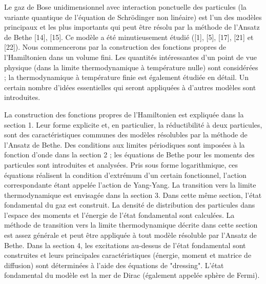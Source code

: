 Le gaz de Bose unidimensionnel avec interaction ponctuelle des particules (la variante quantique de l'équation de Schrödinger non linéaire) est l'un des modèles principaux et les plus importants qui peut être résolu par la méthode de l'Ansatz de Bethe [14], [15]. Ce modèle a été minutieusement étudié ([1], [5], [17], [21] et [22]). Nous commencerons par la construction des fonctions propres de l'Hamiltonien dans un volume fini. Les quantités intéressantes d'un point de vue physique (dans la limite thermodynamique à température nulle) sont considérées ; la thermodynamique à température finie est également étudiée en détail. Un certain nombre d'idées essentielles qui seront appliquées à d'autres modèles sont introduites.

La construction des fonctions propres de l'Hamiltonien est expliquée dans la section 1. Leur forme explicite et, en particulier, la réductibilité à deux particules, sont des caractéristiques communes des modèles résolubles par la méthode de l'Ansatz de Bethe. Des conditions aux limites périodiques sont imposées à la fonction d'onde dans la section 2 ; les équations de Bethe pour les moments des particules sont introduites et analysées. Pris sous forme logarithmique, ces équations réalisent la condition d'extrémum d'un certain fonctionnel, l'action correspondante étant appelée l'action de Yang-Yang. La transition vers la limite thermodynamique est envisagée dans la section 3. Dans cette même section, l'état fondamental du gaz est construit. La densité de distribution des particules dans l'espace des moments et l'énergie de l'état fondamental sont calculées. La méthode de transition vers la limite thermodynamique décrite dans cette section est assez générale et peut être appliquée à tout modèle résoluble par l'Ansatz de Bethe. Dans la section 4, les excitations au-dessus de l'état fondamental sont construites et leurs principales caractéristiques (énergie, moment et matrice de diffusion) sont déterminées à l'aide des équations de "dressing". L'état fondamental du modèle est la mer de Dirac (également appelée sphère de Fermi).

